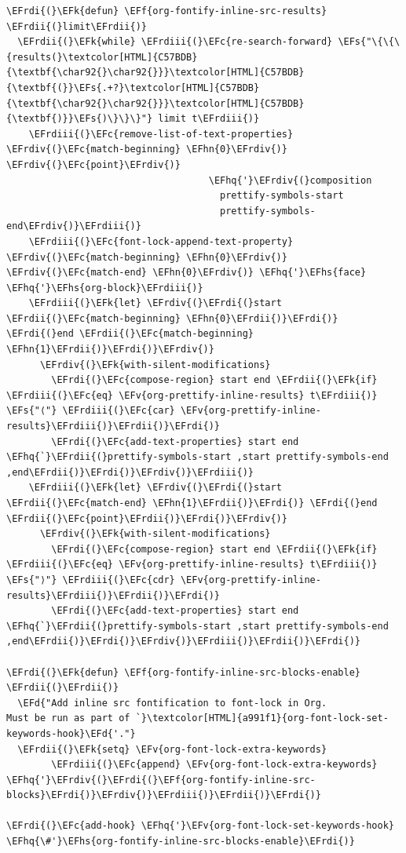 \documentclass{scrartcl}
\newcommand{\EFk}[1]{\textcolor{EFk}{#1}} %
\newcommand{\EFd}[1]{\textcolor{EFd}{#1}} %
\newcommand{\EFs}[1]{\textcolor{EFs}{#1}} %
\newcommand{\EFc}[1]{\textcolor{EFc}{#1}} %
\newcommand{\EFv}[1]{\textcolor{EFv}{#1}} %
\newcommand{\EFf}[1]{\textcolor{EFf}{#1}} %
\newcommand{\EFhn}[1]{#1} %
\newcommand{\EFhq}[1]{#1} %
\newcommand{\EFhs}[1]{#1} %
\newcommand{\EFrdi}[1]{#1} %
\newcommand{\EFrdii}[1]{#1} %
\newcommand{\EFrdiii}[1]{#1} %
\newcommand{\EFrdiv}[1]{#1} %
\begin{document}
\begin{Code}
\begin{Verbatim}[]
\EFrdi{(}\EFk{defun} \EFf{org-fontify-inline-src-results} \EFrdii{(}limit\EFrdii{)}
  \EFrdii{(}\EFk{while} \EFrdiii{(}\EFc{re-search-forward} \EFs{"\{\{\{results(}\textcolor[HTML]{C57BDB}{\textbf{\char92{}\char92{}}}\textcolor[HTML]{C57BDB}{\textbf{(}}\EFs{.+?}\textcolor[HTML]{C57BDB}{\textbf{\char92{}\char92{}}}\textcolor[HTML]{C57BDB}{\textbf{)}}\EFs{)\}\}\}"} limit t\EFrdiii{)}
    \EFrdiii{(}\EFc{remove-list-of-text-properties} \EFrdiv{(}\EFc{match-beginning} \EFhn{0}\EFrdiv{)} \EFrdiv{(}\EFc{point}\EFrdiv{)}
                                    \EFhq{'}\EFrdiv{(}composition
                                      prettify-symbols-start
                                      prettify-symbols-end\EFrdiv{)}\EFrdiii{)}
    \EFrdiii{(}\EFc{font-lock-append-text-property} \EFrdiv{(}\EFc{match-beginning} \EFhn{0}\EFrdiv{)} \EFrdiv{(}\EFc{match-end} \EFhn{0}\EFrdiv{)} \EFhq{'}\EFhs{face} \EFhq{'}\EFhs{org-block}\EFrdiii{)}
    \EFrdiii{(}\EFk{let} \EFrdiv{(}\EFrdi{(}start \EFrdii{(}\EFc{match-beginning} \EFhn{0}\EFrdii{)}\EFrdi{)} \EFrdi{(}end \EFrdii{(}\EFc{match-beginning} \EFhn{1}\EFrdii{)}\EFrdi{)}\EFrdiv{)}
      \EFrdiv{(}\EFk{with-silent-modifications}
        \EFrdi{(}\EFc{compose-region} start end \EFrdii{(}\EFk{if} \EFrdiii{(}\EFc{eq} \EFv{org-prettify-inline-results} t\EFrdiii{)} \EFs{"⟨"} \EFrdiii{(}\EFc{car} \EFv{org-prettify-inline-results}\EFrdiii{)}\EFrdii{)}\EFrdi{)}
        \EFrdi{(}\EFc{add-text-properties} start end \EFhq{`}\EFrdii{(}prettify-symbols-start ,start prettify-symbols-end ,end\EFrdii{)}\EFrdi{)}\EFrdiv{)}\EFrdiii{)}
    \EFrdiii{(}\EFk{let} \EFrdiv{(}\EFrdi{(}start \EFrdii{(}\EFc{match-end} \EFhn{1}\EFrdii{)}\EFrdi{)} \EFrdi{(}end \EFrdii{(}\EFc{point}\EFrdii{)}\EFrdi{)}\EFrdiv{)}
      \EFrdiv{(}\EFk{with-silent-modifications}
        \EFrdi{(}\EFc{compose-region} start end \EFrdii{(}\EFk{if} \EFrdiii{(}\EFc{eq} \EFv{org-prettify-inline-results} t\EFrdiii{)} \EFs{"⟩"} \EFrdiii{(}\EFc{cdr} \EFv{org-prettify-inline-results}\EFrdiii{)}\EFrdii{)}\EFrdi{)}
        \EFrdi{(}\EFc{add-text-properties} start end \EFhq{`}\EFrdii{(}prettify-symbols-start ,start prettify-symbols-end ,end\EFrdii{)}\EFrdi{)}\EFrdiv{)}\EFrdiii{)}\EFrdii{)}\EFrdi{)}

\EFrdi{(}\EFk{defun} \EFf{org-fontify-inline-src-blocks-enable} \EFrdii{(}\EFrdii{)}
  \EFd{"Add inline src fontification to font-lock in Org.
Must be run as part of `}\textcolor[HTML]{a991f1}{org-font-lock-set-keywords-hook}\EFd{'."}
  \EFrdii{(}\EFk{setq} \EFv{org-font-lock-extra-keywords}
        \EFrdiii{(}\EFc{append} \EFv{org-font-lock-extra-keywords} \EFhq{'}\EFrdiv{(}\EFrdi{(}\EFf{org-fontify-inline-src-blocks}\EFrdi{)}\EFrdiv{)}\EFrdiii{)}\EFrdii{)}\EFrdi{)}

\EFrdi{(}\EFc{add-hook} \EFhq{'}\EFv{org-font-lock-set-keywords-hook} \EFhq{\#'}\EFhs{org-fontify-inline-src-blocks-enable}\EFrdi{)}
\end{Verbatim}
\end{Code}
\end{document}
